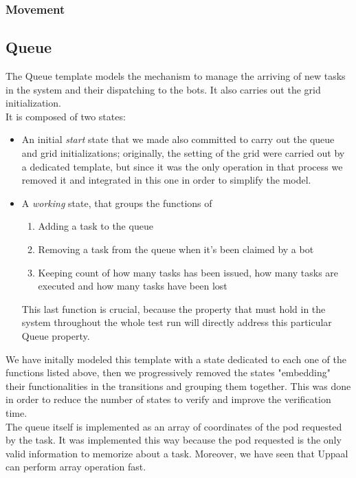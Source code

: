 \documentclass[10pt,a4paper]{article}
\begin{document}
			\subsubsection{Movement}
		
		\subsection{Queue}
			The Queue template models the mechanism to manage the arriving of new tasks in the system and their dispatching to the bots. It also carries out the grid initialization.\\
			It is composed of two states:
			\begin{itemize}
				\item An initial \emph{start} state that we made also committed to carry out the queue and grid initializations; originally, the setting of the grid were carried out by a dedicated template, but since it was the only operation in that process we removed it and integrated in this one in order to simplify the model.
				\item A \emph{working} state, that groups the functions of
					\begin{enumerate}
						\item Adding a task to the queue
						\item Removing a task from the queue when it's been claimed by a bot
						\item Keeping count of how many tasks has been issued, how many tasks are executed and how many tasks have been lost
					\end{enumerate}
					This last function is crucial, because the property that must hold in the system throughout the whole test run will directly address this particular Queue property.
			\end{itemize}
			We have initally modeled this template with a state dedicated to each one of the functions listed above, then we progressively removed the states "embedding" their functionalities in the transitions and grouping them together. This was done in order to reduce the number of states to verify and improve the verification time.\\
			The queue itself is implemented as an array of coordinates of the pod requested by the task. It was implemented this way because the pod requested is the only valid information to memorize about a task. Moreover, we have seen that Uppaal can perform array operation fast. 
		
\end{document}
